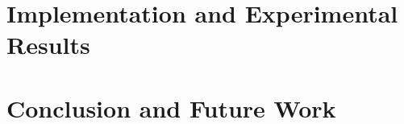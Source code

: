 \documentclass[runningheads]{llncs}
\begin{document}
\section{Implementation and Experimental Results} \label{sec:implementation}


\section{Conclusion and Future Work} \label{sec:conclu}




\end{document}
